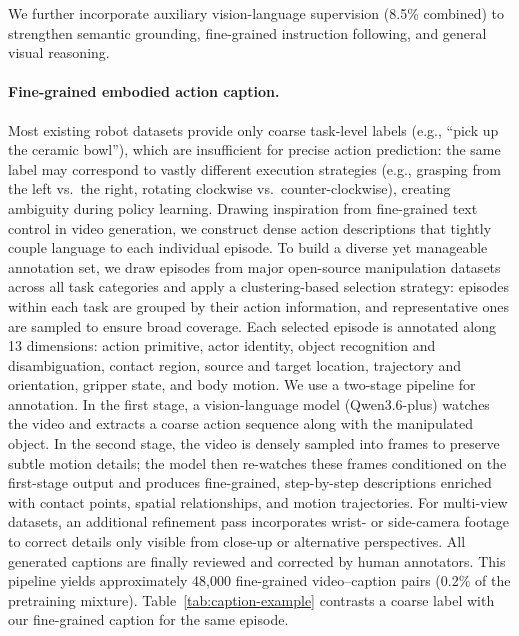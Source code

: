 \label{sec:vl-data}

We further incorporate auxiliary vision-language supervision (8.5\% combined)
to strengthen semantic grounding, fine-grained instruction following, and
general visual reasoning.

\paragraph{Fine-grained embodied action caption.}
Most existing robot datasets provide only coarse task-level labels
(e.g., ``pick up the ceramic bowl''), which are insufficient for precise
action prediction: the same label may correspond to vastly different
execution strategies (e.g., grasping from the left vs.\ the right,
rotating clockwise vs.\ counter-clockwise), creating ambiguity during
policy learning. Drawing inspiration from fine-grained text control in
video generation, we construct dense action descriptions that tightly
couple language to each individual episode.
%
To build a diverse yet manageable annotation set, we draw episodes from
major open-source manipulation datasets across all task categories and
apply a clustering-based selection strategy: episodes within each task
are grouped by their action information, and representative ones are
sampled to ensure broad coverage.
%
Each selected episode is annotated along 13 dimensions: action primitive,
actor identity, object recognition and disambiguation, contact region,
source and target location, trajectory and orientation, gripper state,
and body motion. We use a two-stage pipeline for annotation.
In the first stage, a vision-language model (Qwen3.6-plus) watches the
video and extracts a coarse action sequence along with the manipulated
object. In the second stage, the video is densely sampled into frames
to preserve subtle motion details; the model then re-watches these
frames conditioned on the first-stage output and produces fine-grained,
step-by-step descriptions enriched with contact points, spatial
relationships, and motion trajectories.
For multi-view datasets, an additional refinement pass incorporates
wrist- or side-camera footage to correct details only visible from
close-up or alternative perspectives.
All generated captions are finally reviewed and corrected by human
annotators.
%
This pipeline yields approximately 48{,}000 fine-grained video--caption
pairs (0.2\% of the pretraining mixture).
Table~\ref{tab:caption-example} contrasts a coarse label with our
fine-grained caption for the same episode.

